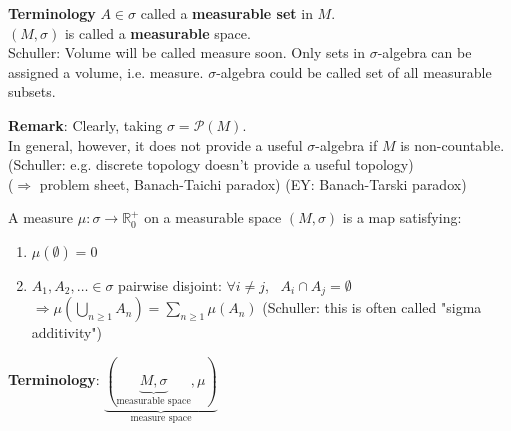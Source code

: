 \textbf{Terminology} $A\in \sigma$ called a \textbf{measurable set} in $M$. \\
\phantom{Terminology} $(M, \sigma)$ is called a \textbf{measurable} space. \\

Schuller: Volume will be called measure soon. Only sets in $\sigma$-algebra can be assigned a volume, i.e. measure. $\sigma$-algebra could be called set of all measurable subsets.

\textbf{Remark}: Clearly, taking $\sigma = \mathcal{P}(M)$. \\
In general, however, it does not provide a useful $\sigma$-algebra if $M$ is non-countable. (Schuller: e.g. discrete topology doesn't provide a useful topology)  \\

($\Longrightarrow$ problem sheet, Banach-Taichi paradox) (EY: Banach-Tarski paradox)

\begin{definition}\label{agat:Def:measure}
	A measure $\mu : \sigma \to \mathbb{R}_0^+$ on a measurable space $(M, \sigma)$ is a map satisfying:
	\begin{enumerate}
		\item[(i)] $\mu(\emptyset) = 0$
		\item[(ii)] $A_1, A_2, \dots \in \sigma$ pairwise disjoint: $\forall i \neq j$, \, $A_i \cap A_j = \emptyset$ \\
		$\Longrightarrow \mu (\bigcup_{n \geq 1} A_n ) = \sum_{n \geq 1} \mu(A_n)$ (Schuller: this is often called "sigma additivity")
	\end{enumerate}
\end{definition}

\textbf{Terminology}: $ \underbrace{ ( \underbrace{M, \sigma}_{\text{measurable space}}, \mu) }_{\text{measure space}}$

